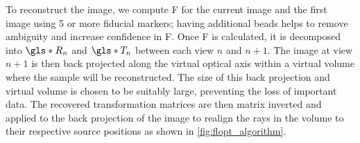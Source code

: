 \documentclass{osa-article}
\begin{document}
To reconstruct the image, we compute \gls*{F} for the current image and the first image using 5 or more fiducial markers; having additional beads helps to remove ambiguity and increase confidence in \gls*{F}.
Once \gls*{F} is calculated, it is decomposed into \(\gls*{R}_n\) and \(\gls*{T}_n\) between each view \(n\) and \(n+1\).
The image at view \(n+1\) is then back projected along the virtual optical axis within a virtual volume where the sample will be reconstructed.
The size of this back projection and virtual volume is chosen to be suitably large, preventing the loss of important data.
The recovered transformation matrices are then matrix inverted and applied to the back projection of the image to realign the rays in the volume to their respective source positions as shown in \figurename\ref{fig:flopt_algorithm}. %
\end{document}
